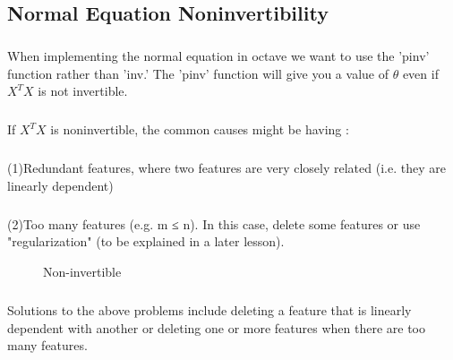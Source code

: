 \documentclass{article}
\begin{document}
\begin{CJK}{UTF8}{gbsn}
\subsection{Normal Equation Noninvertibility}
\subparagraph*{}
When implementing the normal equation in octave we want to use the 'pinv' function rather than 'inv.' The 'pinv' function will give you a value of $\theta$ even if $X^TX$ is not invertible. 
\subparagraph*{}
If $X^TX$ is noninvertible, the common causes might be having :
\subparagraph*{}
(1)Redundant features, where two features are very closely related (i.e. they are linearly dependent)
\subparagraph*{}
(2)Too many features (e.g. m ≤ n). In this case, delete some features or use "regularization" (to be explained in a later lesson).
\begin{figure}[H]
\caption{Non-invertible}
\label{fig:238}
\end{figure}
\subparagraph*{}
Solutions to the above problems include deleting a feature that is linearly dependent with another or deleting one or more features when there are too many features.
\end{CJK}
\end{document}
